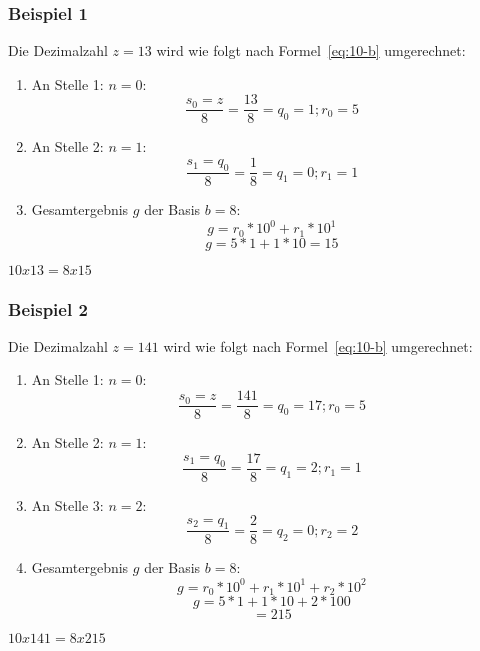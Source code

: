 \subsubsection{Beispiel 1}
Die Dezimalzahl $z=13$ wird wie folgt nach Formel~\ref{eq:10-b} umgerechnet:
\begin{enumerate}
	\item An Stelle 1: $n=0$: \[\frac{s_{0}=z}{8}=\frac{13}{8}=q_{0}=1;r_{0}=5\]
	\item An Stelle 2: $n=1$: \[\frac{s_{1}=q_{0}}{8}=\frac{1}{8}=q_{1}=0;r_{1}=1\]
	\item Gesamtergebnis $g$ der Basis $b=8$: \[g=r_{0}*10^{0}+r_{1}*10^{1}\] \[g=5*1+1*10=15\]
\end{enumerate}
\(10x13=8x15\)
\subsubsection{Beispiel 2}
Die Dezimalzahl $z=141$ wird wie folgt nach Formel~\ref{eq:10-b} umgerechnet:
\begin{enumerate}
    \item An Stelle 1: $n=0$: \[\frac{s_{0}=z}{8}=\frac{141}{8}=q_{0}=17; r_{0}=5\]
    \item An Stelle 2: $n=1$: \[\frac{s_{1}=q_{0}}{8}=\frac{17}{8}=q_{1}=2; r_{1}=1\]
    \item An Stelle 3: $n=2$: \[\frac{s_{2}=q_{1}}{8}=\frac{2}{8}=q_{2}=0; r_{2}=2\]
    \item Gesamtergebnis $g$ der Basis $b=8$: \[g=r_{0}*10^{0}+r_{1}*10^{1}+r_{2}*10^{2}\] \[g=5*1+1*10+2*100\]\[=215\]
\end{enumerate}
\(10x141=8x215\)
